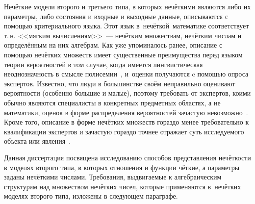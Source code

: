 Нечёткие модели второго и третьего типа, в которых нечёткими являются либо их параметры, либо состояния и входные и выходные данные, описываются с помощью критериального языка. Этот язык в~нечёткой~математике соответствует т.\,н. <<мягким вычислениям>>~--- нечётким множествам, нечётким числам и определённым на них алгебрам. Как уже упоминалось ранее, описание с помощью нечётких множеств имеет существенные преимущества перед языком теории вероятностей в том случае, когда имеется лингвистическая неоднозначность в смысле полисемии~\cite{Borisov_Alexeev_Msk}, и~оценки получаются c помощью опроса экспертов. Известно, что люди в большинстве своём неправильно оценивают вероятности (особенно большие и малые), поэтому требовать от экспертов, коими обычно являются специалисты в конкретных предметных областях, а не математики, оценок в форме распределения вероятностей зачастую невозможно~\cite{Gubko}. Кроме того, описание в форме нечётких множеств гораздо менее требовательно к квалификации экспертов и зачастую гораздо точнее отражает суть исследуемого объекта или явления~\cite{Fuller}.

Данная диссертация посвящена исследованию способов представления нечёткости в моделях второго типа, в которых отношения и функции чёткие, а параметры заданы нечёткими числами. Требования, выдвигаемые к алгебраическим структурам над множеством нечётких чисел, которые применяются в~нечётких моделях второго типа, изложены в следующем параграфе.